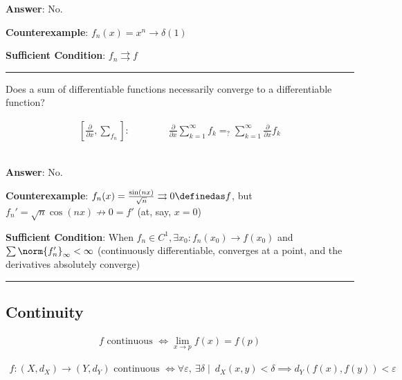 \textbf{Answer}: No.

\textbf{Counterexample}: \(f_n(x) = x^n \to \delta(1)\)

\textbf{Sufficient Condition}: \(f_n \rightrightarrows f\)

\begin{center}\rule{0.5\linewidth}{0.5pt}\end{center}

Does a sum of differentiable functions necessarily converge to a
differentiable function?

\begin{align*}
\left[\frac{\partial}{\partial x}, \sum_{f_n}\right]: \qquad\qquad
\frac{\partial}{\partial x} \sum_{k=1}^\infty f_k =_? \sum_{k=1}^\infty \frac{\partial}{\partial x} f_k \\
\text{} \\
\text{}\\
\end{align*}

\textbf{Answer}: No.

\textbf{Counterexample}:
\(f_n(x) = \frac{\sin(nx)}{\sqrt{n}} \rightrightarrows 0 \definedas f\),
but \(f_n' = \sqrt{n}\cos(nx) \not\to 0 = f'\) (at, say, \(x=0\))

\textbf{Sufficient Condition}: When
\(f_n \in C^1, \exists x_0: f_n(x_0) \to f(x_0)\) and
\(\sum \norm{f_n'}_\infty < \infty\) (continuously differentiable,
converges at a point, and the derivatives absolutely converge)

\begin{center}\rule{0.5\linewidth}{0.5pt}\end{center}

\hypertarget{continuity}{%
\subsection{Continuity}\label{continuity}}

\begin{definition}

\begin{align*}
f\text{ continuous } \iff \lim_{x \to p} f(x) = f(p)
\end{align*}

\end{definition}

\begin{definition}

\begin{align*}
f:(X, d_X) \to (Y, d_Y) \text{ continuous } \iff \forall \varepsilon,~ \exists \delta \mid ~
d_X(x,y) < \delta \implies d_Y(f(x), f(y)) < \varepsilon
\end{align*}

\end{definition}

